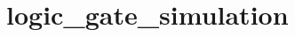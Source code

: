 \chapter{logic\+\_\+gate\+\_\+simulation}
\label{md__r_e_a_d_m_e}
\label{md__r_e_a_d_m_e_autotoc_md0}%
